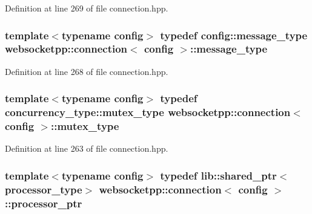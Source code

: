Definition at line 269 of file connection.\+hpp.

\hypertarget{classwebsocketpp_1_1connection_a26f1fe3979ff1d2dc5e1461e4f2bc621}{}
\subsubsection[{message\+\_\+type}]{\setlength{\rightskip}{0pt plus 5cm}template$<$typename config$>$ typedef config\+::message\+\_\+type {\bf websocketpp\+::connection}$<$ config $>$\+::{\bf message\+\_\+type}}\label{classwebsocketpp_1_1connection_a26f1fe3979ff1d2dc5e1461e4f2bc621}


Definition at line 268 of file connection.\+hpp.

\hypertarget{classwebsocketpp_1_1connection_a837046a7435ad7d051ac6da827d78caa}{}
\subsubsection[{mutex\+\_\+type}]{\setlength{\rightskip}{0pt plus 5cm}template$<$typename config$>$ typedef concurrency\+\_\+type\+::mutex\+\_\+type {\bf websocketpp\+::connection}$<$ config $>$\+::{\bf mutex\+\_\+type}}\label{classwebsocketpp_1_1connection_a837046a7435ad7d051ac6da827d78caa}


Definition at line 263 of file connection.\+hpp.

\hypertarget{classwebsocketpp_1_1connection_a7e955b2fc98102bb3776e993f95c9009}{}
\subsubsection[{processor\+\_\+ptr}]{\setlength{\rightskip}{0pt plus 5cm}template$<$typename config$>$ typedef lib\+::shared\+\_\+ptr$<${\bf processor\+\_\+type}$>$ {\bf websocketpp\+::connection}$<$ config $>$\+::{\bf processor\+\_\+ptr}}\label{classwebsocketpp_1_1connection_a7e955b2fc98102bb3776e993f95c9009}


